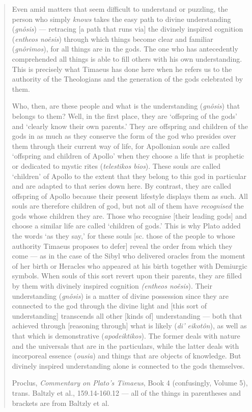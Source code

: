\documentclass[
]{book}
\begin{document}
\begin{quote}
Even amid matters that seem difficult to understand or puzzling, the person who simply \emph{knows} takes the easy path to divine understanding (\emph{gnôsis}) --- retracing {[}a path that runs via{]} the divinely inspired cognition (\emph{entheos noêsis}) through which things become clear and familiar (\emph{gnôrimos}), for all things are in the gods. The one who has antecedently comprehended all things is able to fill others with his own understanding. This is precisely what Timaeus has done here when he refers us to the authority of the Theologians and the generation of the gods celebrated by them.

Who, then, are these people and what is the understanding (\emph{gnôsis}) that belongs to them? Well, in the first place, they are `offspring of the gods' and `clearly know their own parents.' They are offspring and children of the gods in as much as they conserve the form of the god who presides over them through their current way of life, for Apollonian souls are called `offspring and children of Apollo' when they choose a life that is prophetic or dedicated to mystic rites (\emph{telestikos bios}). These souls are called `children' of Apollo to the extent that they belong to this god in particular and are adapted to that series down here. By contrast, they are called offspring of Apollo because their present lifestyle displays them as such. All souls are therefore children of god, but not all of them have \emph{recognised} the gods whose children they are. Those who recognise {[}their leading gods{]} and choose a similar life are called `children of gods.' This is why Plato added the words `as they say,' for these souls {[}sc. those of the people to whose authority Timaeus proposes to defer{]} reveal the order from which they come --- as in the case of the Sibyl who delivered oracles from the moment of her birth or Heracles who appeared at his birth together with Demiurgic symbols. When souls of this sort revert upon their parents, they are filled by them with divinely inspired cognition \emph{(entheos noêsis}). Their understanding (\emph{gnôsis}) is a matter of divine possession since they are connected to the god through the divine light and {[}this sort of understanding{]} transcends all other {[}kinds of{]} understanding --- both that achieved through {[}reasoning through{]} what is likely (\emph{di' eikotôn}), as well as that which is demonstrative (\emph{apodeiktikos}). The former deals with nature and the universals that are in the particulars, while the latter deals with incorporeal essence (\emph{ousia}) and things that are objects of knowledge. But divinely inspired understanding alone is connected to the gods themselves.

Proclus, \emph{Commentary on Plato's Timaeus}, Book 4 (confusingly, Volume 5), trans. Baltzly et al., 159.14-160.12 --- all of the things in parentheses and brackets are from Baltzly et al.
\end{quote}
\end{document}

